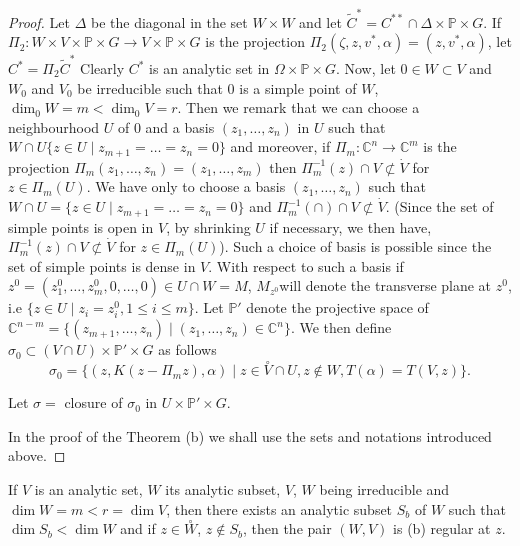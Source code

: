 \begin{proof}
Let  $\Delta$ be the  diagonal  in the set $W \times W$ and let
$\tilde{C}^\ast= C^{\ast\ast} \cap \Delta \times \mathbb{P}\times
G$. If $\Pi_2 : W \times V \times \mathbb{P} \times G \to V
\times \mathbb{P} \times G$ is the  projection  $\Pi_2
(\zeta,z,v^\ast, \alpha)=(z,v^\ast,\alpha)$, let  $C^{\ast}=\Pi_2
\tilde{C}^\ast$ Clearly $C^\ast$ is an analytic set in $\Omega
\times \mathbb{P} \times G$. Now, let  $0 \in W \subset V$ and
$W_0$ and $V_0$ be irreducible such that $0$ is a simple
point of $W$, $\dim_0 W=m < \dim_0 V=r$. Then  we remark  that
we can choose a neighbourhood $U$ of $0$ and a  basis $(z_1, \ldots ,
z_n)$ in $U$ such that  $W \cap U\bigg\{z \in U \mid z_{m+1}= \ldots=
z_n =0\bigg\}$ and moreover, if  $\Pi_m :  \mathbb{C}^n \to
\mathbb{C}^m$ is the projection $\Pi_m (z_1, \ldots ,z_n)=(z_1, \ldots
, z_m)$ then  $\Pi_m^{-1}(z)\cap V \not\subset \dot{V}$ for  $z \in
\Pi_m(U)$. We  have only to choose a basis $(z_1, \ldots ,z_n)$ such
that  $W \cap U =\bigg\{z \in U \mid z_{m+1}=\ldots= z_n =0\bigg\}$
and  $\Pi_m^{-1} (\cap) \cap V \not\subset  \dot{V}$. (Since the set of
simple  points is open in $V$, by shrinking $U$ if  necessary, we then
have, $\Pi_m^{-1}(z)\cap V \not\subset \dot{V}$  for  $z \in
\Pi_m(U)$). Such a choice of basis is possible since the set of simple
points is dense in $V$. With respect to such a basis if  
$z^0 =(z^0_1,\ldots,z^0_m,0,\ldots,0)\in  U \cap
W = M$, $M_{z^0}$\pageoriginale will denote the transverse 
plane at $z^0$, i.e $\{ z \in  U \mid z_i = z^0_i, 1 \leq i
\leq m \}$. Let $\mathbb{P}'$ denote the projective space of  
$\mathbb{C}^{n-m} = \bigg\{ (z_{m+1},\ldots,z_n) \mid
(z_1,\ldots,z_n) \in \mathbb{C}^n \bigg \}$. We 
then define $\sigma_0 \subset (V \cap U) \times   \mathbb{P}'
\times G$ as follows 
$$
\sigma_0 =\bigg \{ (z, K (z - \Pi_m z), \alpha ) \mid z  \in
\overset{\circ}{V} \cap U, z \notin  W, T ( \alpha) = T(V,z) \bigg \}.   
$$

Let $\sigma = $ closure of $\sigma_0$ in $U \times \mathbb{P}'\times G$. 

In the proof of the Theorem (b) we shall use the sets and notations
introduced above. 
\end{proof}

\begin{theorem*}[Whitney]
  If $V$ is an analytic set, $W$ its analytic subset, $V$, $W$ being
  irreducible and $\dim W = m < r = \dim V$, then there exists an
  analytic subset $S_b$ of $W$ such that $\dim S_b < \dim W$ and if
  $z \in  \overset{\circ}{W}$, $z \notin S_b$,  then the pair $(W,V)$ is
  (b) regular at $z$.   
\end{theorem*} 

